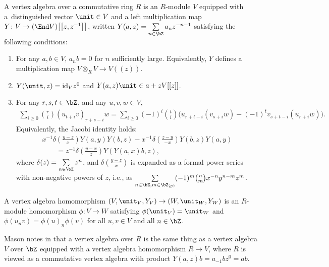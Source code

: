 \begin{defn}
A vertex algebra over a commutative ring $R$ is an $R$-module $V$ equipped with a~distinguished vector $\unit \in V$ and a left multiplication map $Y\colon V \to (\End V)\big[\big[z,z^{-1}\big]\big]$, written $Y(a,z) = \sum\limits_{n \in \bZ} a_n z^{-n-1}$ satisfying the following conditions:
\begin{enumerate}\itemsep=0pt
\item For any $a,b \in V$, $a_n b = 0$ for $n$ sufficiently large. Equivalently, $Y$ defines a multiplication map $V \otimes_{R} V \to V((z))$.
\item $Y(\unit,z) = {\rm id}_V z^0$ and $Y(a,z)\unit \in a + zV[[z]]$.
\item For any $r,s,t \in \bZ$, and any $u,v,w \in V$,
\begin{gather*} \sum_{i \geq 0} \binom{r}{i} (u_{t+i} v)_{r+s-i} w = \sum_{i \geq 0} (-1)^i \binom{t}{i} \big(u_{r+t-i}(v_{s+i}w) - (-1)^t v_{s+t-i}(u_{r+i} w)\big).\end{gather*}
Equivalently, the Jacobi identity holds:
 \begin{gather*}
x^{-1} \delta\left(\frac{y-z}{x}\right) Y(a,y) Y(b,z) - x^{-1} \delta\left(\frac{z-y}{-x}\right) Y(b,z) Y(a,y) \\
\qquad{} = z^{-1} \delta\left(\frac{y-x}{z}\right) Y(Y(a,x)b,z),
\end{gather*}
where $\delta(z) = \sum\limits_{n \in \bZ} z^n$, and $\delta\left(\frac{y-z}{x}\right)$ is expanded as a formal power series with non-negative powers of $z$, i.e., as $\sum\limits_{n \in \bZ, m \in \bZ_{\geq 0}} (-1)^m \binom{n}{m} x^{-n}y^{n-m}z^m$.
\end{enumerate}
A vertex algebra homomorphism $(V, \unit_V, Y_V) \to (W, \unit_W, Y_W)$ is an $R$-module homomorphism $\phi\colon V \to W$ satisfying $\phi(\unit_V) = \unit_W$ and $\phi(u_n v) = \phi(u)_n \phi(v)$ for all $u,v \in V$ and all $n \in \bZ$.
\end{defn}

\begin{rem}
Mason notes in \cite{M17} that a vertex algebra over $R$ is the same thing as a vertex algebra $V$ over $\bZ$ equipped with a vertex algebra homomorphism $R \to V$, where $R$ is viewed as a commutative vertex algebra with product $Y(a,z)b = a_{-1}b z^0 = ab$.
\end{rem}

